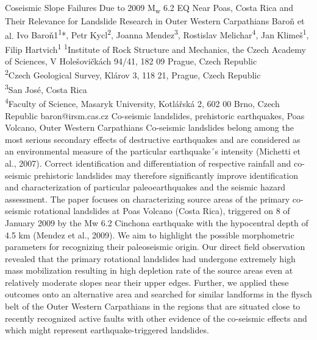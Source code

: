 \abstract
{Coseismic Slope Failures Due to 2009 M\textsubscript{w} 6.2 EQ Near Poas, Costa Rica and Their Relevance for Landslide Research in Outer Western Carpathians} 
{Baroň et al.} 
{Ivo Baroň1\textsuperscript{1}*, Petr Kycl\textsuperscript{2}, Joanna Mendez\textsuperscript{3}, Rostislav Melichar\textsuperscript{4}, Jan Klimeš\textsuperscript{1}, Filip Hartvich\textsuperscript{1}} 
{\TLtag} 
{
\textsuperscript{1}Institute of Rock Structure and Mechanics, the Czech Academy of Sciences, V Holešovičkách 94/41, 182 09 Prague, Czech Republic\\
\textsuperscript{2}Czech Geological Survey, Klárov 3, 118 21, Prague, Czech Republic\\
\textsuperscript{3}San José, Costa Rica\\
\textsuperscript{4}Faculty of Science, Masaryk University, Kotlářská 2, 602 00 Brno, Czech Republic
}
{baron@irsm.cas.cz}  %
{Co-seismic landslides, prehistoric earthquakes, Poas Volcano, Outer Western Carpathians}
{Co-seismic landslides belong among the most serious secondary effects of destructive earthquakes and are considered as an environmental measure of the particular earthquake´s intensity (Michetti et al., 2007). Correct identification and differentiation of respective rainfall and co-seismic prehistoric landslides may therefore significantly improve identification and characterization of particular paleoearthquakes and the seismic hazard assessment. The paper focuses on characterizing source areas of the primary co-seismic rotational landslides at Poas Volcano (Costa Rica), triggered on 8 of January 2009 by the Mw 6.2 Cinchona earthquake with the hypocentral depth of 4.5 km (Mendez et al., 2009). We aim to highlight the possible morphometric parameters for recognizing their paleoseismic origin. Our direct field observation revealed that the primary rotational landslides had undergone extremely high mass mobilization resulting in high depletion rate of the source areas even at relatively moderate slopes near their upper edges. Further, we applied these outcomes onto an alternative area and searched for similar landforms in the flysch belt of the Outer Western Carpathians in the regions that are situated close to recently recognized active faults with other evidence of the co-seismic effects and which might represent earthquake-triggered landslides.
}
